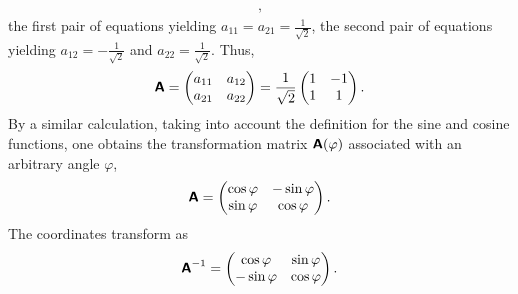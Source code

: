 {\begin{enumerate}
\begin{equation}
\begin{split}
,
\end{split}
\end{equation}
the first pair of equations yielding
$a_{11}=a_{21}=\frac{1}{\sqrt{2}}$,
the second pair of equations yielding
$a_{12}=-\frac{1}{\sqrt{2}}$ and $a_{22}=\frac{1}{\sqrt{2}}$.
Thus,
\begin{equation}
 \textsf{\textbf{A}}=
\begin{pmatrix}
a_{11}&a_{12}\\
a_{21}&a_{22}
\end{pmatrix}
=
\frac{1}{\sqrt{2}}
\begin{pmatrix}
1&-1\\
1&1
\end{pmatrix}
.
\end{equation}
By a similar calculation, taking into account the definition for the sine and cosine functions,
one obtains the transformation matrix $\textsf{\textbf{A}}(\varphi )$
associated with an arbitrary angle $\varphi$,
\begin{equation}
 \textsf{\textbf{A}}
=
\begin{pmatrix}
\cos \varphi &-\sin \varphi\\
\sin \varphi &\cos \varphi
\end{pmatrix}
.
\label{2012-m-ch-fdvs-otd2}
\end{equation}
The coordinates transform as
\begin{equation}
 \textsf{\textbf{A}}^{-1}
=
\begin{pmatrix}
\cos \varphi &\sin \varphi\\
-\sin \varphi &\cos \varphi
\end{pmatrix}
.
\end{equation}


\end{enumerate}}
